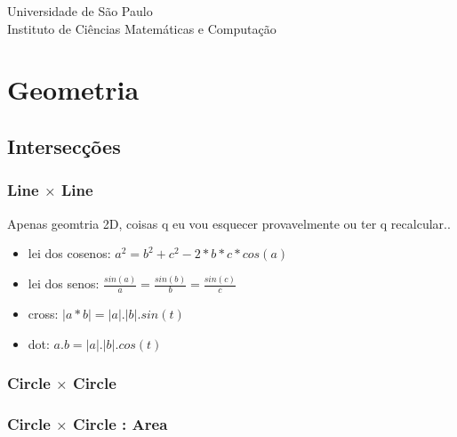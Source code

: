 \documentclass{report}
\begin{document}
\begin{titlepage}
\begin{center}
\Huge{\textsf{Universidade de São Paulo}}\\
\Large{\textsf{Instituto de Ciências Matemáticas e Computação}}
\end{center}
\end{titlepage}

\clearpage
\tableofcontents
\clearpage


\chapter{Geometria}
\section{Intersecções}
\subsection{Line $\times$ Line}
Apenas geomtria 2D, coisas q eu vou esquecer provavelmente ou ter q recalcular..\\
\begin{itemize}
\item{lei dos cosenos: $a^2 = b^2 + c^2 -2*b*c*cos(a)$}
\item{lei dos senos: $\frac{sin(a)}{a} = \frac{sin(b)}{b} = \frac{sin(c)}{c}$}
\item{cross: $|a*b| = |a|.|b|.sin(t)$}
\item{dot: $a.b = |a|.|b|.cos(t)$}
\end{itemize}

%
%

\subsection{Circle $\times$ Circle}
%
\subsection{Circle $\times$ Circle : Area}

%
\end{document}
